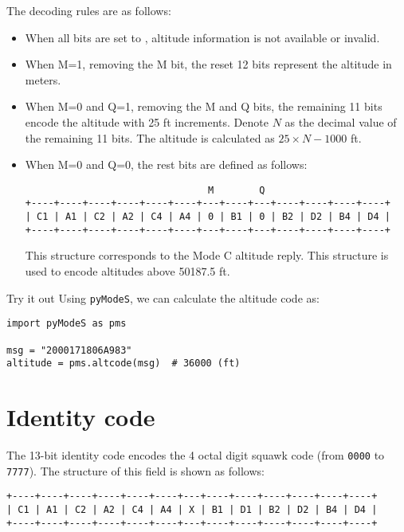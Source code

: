 The decoding rules are as follows:

\begin{itemize}
  \item When all bits are set to \0, altitude information is not available or invalid.

  \item When M=1, removing the M bit, the reset 12 bits represent the altitude in meters.

  \item When M=0 and Q=1, removing the M and Q bits, the remaining 11 bits encode the altitude with 25 ft increments. Denote $N$ as the decimal value of the remaining 11 bits. The altitude is calculated as $25 \times N - 1000$ ft.

  \item When M=0 and Q=0, the rest bits are defined as follows:

\begin{verbatim}
                                M        Q
+----+----+----+----+----+----+---+----+---+----+----+----+----+
| C1 | A1 | C2 | A2 | C4 | A4 | 0 | B1 | 0 | B2 | D2 | B4 | D4 |
+----+----+----+----+----+----+---+----+---+----+----+----+----+
\end{verbatim}

  This structure corresponds to the Mode C altitude reply. This structure is used to encode altitudes above 50187.5 ft.

\end{itemize}

\begin{notebox}{Try it out}
Using \texttt{pyModeS}, we can calculate the altitude code as: 

\begin{verbatim}
import pyModeS as pms

msg = "2000171806A983"
altitude = pms.altcode(msg)  # 36000 (ft)
\end{verbatim}

\end{notebox}


\section{Identity code} \label{sec:id_code}

The 13-bit identity code encodes the 4 octal digit squawk code (from \texttt{0000} to \texttt{7777}). The structure of this field is shown as follows:

\begin{verbatim}
+----+----+----+----+----+----+---+----+----+----+----+----+----+
| C1 | A1 | C2 | A2 | C4 | A4 | X | B1 | D1 | B2 | D2 | B4 | D4 |
+----+----+----+----+----+----+---+----+----+----+----+----+----+
\end{verbatim}

